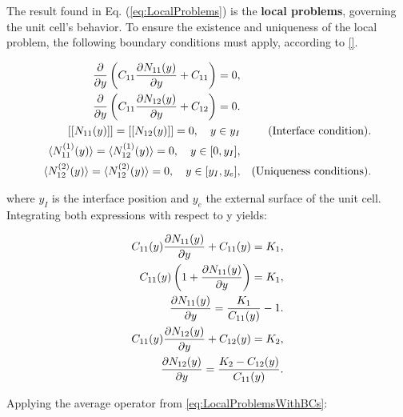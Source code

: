 \RaggedRight The result found in Eq. (\ref{eq:LocalProblems}) is the \textbf{local problems}, governing the unit cell's behavior. To ensure the existence and uniqueness of the local problem, the following boundary conditions must apply, according to \ref{}.

\begin{equation} \label{eq:LocalProblemsWithBCs}
    \begin{aligned}
        \frac{\partial }{\partial y} \left( C_{11}\frac{\partial N_{11}(y)}{\partial y} + C_{11}\right) = 0, \\
        \frac{\partial }{\partial y} \left( C_{11}\frac{\partial N_{12}(y)}{\partial y} + C_{12}\right) = 0. \\
        [[N_{11}(y)]] = [[N_{12}(y)]] = 0, \quad y\in {y_I} && \quad(\text{Interface condition}).\\
        \langle N^{(1)}_{11}(y) \rangle = \langle N^{(1)}_{12}(y) \rangle = 0, \quad y \in [0, y_I],  \\ 
        \langle N^{(2)}_{12}(y) \rangle = \langle N^{(2)}_{12}(y) \rangle =0, \quad y \in [ y_I, y_e ],  && (\text{Uniqueness conditions}).
    \end{aligned}
\end{equation}

where $y_I$ is the interface position and $y_e$ the external surface of the unit cell. Integrating both expressions with respect to y yields:

\begin{equation} \label{eq:IntegratedLocalProblems}
    \begin{aligned}
         C_{11}(y)\frac{\partial N_{11}(y)}{\partial y} + C_{11}(y) = K_1, \\
         C_{11}(y)\left( 1 + \frac{\partial N_{11}(y)}{\partial y} \right) = K_1, \\
        \frac{\partial N_{11}(y)}{\partial y} = \frac{K_1}{C_{11}(y)} - 1.\\
         C_{11}(y)\frac{\partial N_{12}(y)}{\partial y} + C_{12}(y) = K_2, \\
         \frac{\partial N_{12}(y)}{\partial y} = \frac{K_2 - C_{12}(y)}{C_{11}(y)}.
    \end{aligned}
\end{equation}

Applying the average operator from \ref{eq:LocalProblemsWithBCs}:

